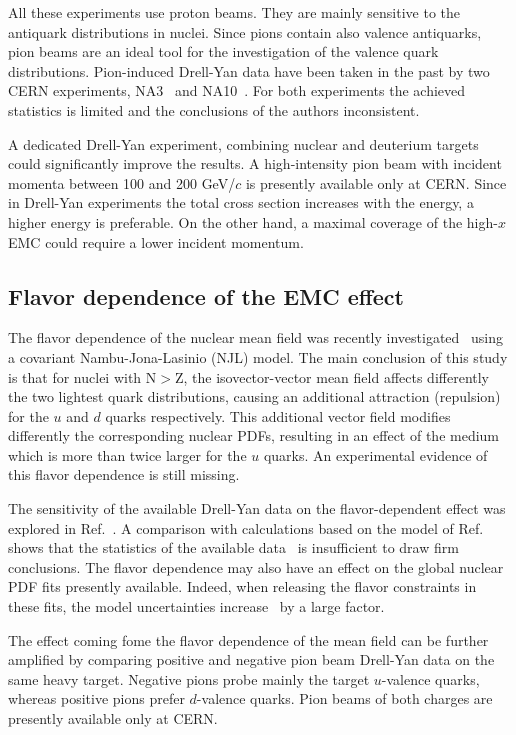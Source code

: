 All these experiments use proton beams. They are mainly sensitive to the antiquark 
distributions in nuclei.  Since pions contain also valence antiquarks, pion beams are  
an ideal tool for the investigation of the valence quark distributions. Pion-induced Drell-Yan data have 
been taken in the past by two CERN experiments, NA3~\cite{Badier:1981ci} 
and NA10~\cite{Bordalo:1987cs}.  For both experiments the achieved statistics is limited
and the conclusions of the authors inconsistent.  

A dedicated Drell-Yan experiment, 
combining nuclear and deuterium targets could significantly improve the results. 
A high-intensity pion beam with incident momenta between 100 and 200 GeV/$c$ is presently available 
only at CERN. Since in Drell-Yan experiments the total cross section increases with the energy, a higher 
energy is preferable. On the other hand, a maximal coverage of the high-$x$ EMC could require a 
lower incident momentum.  

\subsection{Flavor dependence of the EMC effect} 
The flavor dependence of the nuclear mean field was recently investigated~\cite{Cloet:2009qs} using a 
covariant Nambu-Jona-Lasinio (NJL) model.  The main conclusion of this study is that for nuclei with 
N$>$Z, the isovector-vector mean field affects differently the two lightest quark distributions,
causing an additional attraction (repulsion) for the $u$ and $d$ quarks respectively. 
This additional vector field modifies differently the corresponding nuclear PDFs, resulting in an effect of 
the medium which is more than twice larger for the $u$ quarks. An experimental evidence of this flavor 
dependence is still missing. 

The sensitivity of the available Drell-Yan data on the flavor-dependent effect was explored in 
Ref.~\cite{Dutta:2010pg}. A comparison with calculations based on the model of Ref.~\cite{Cloet:2009qs} 
shows that the  statistics of the available data~\cite{Badier:1981ci,Bordalo:1987cs} is insufficient to draw firm conclusions. 
The flavor dependence may also have an effect 
on the global nuclear PDF fits presently available. Indeed, when releasing the flavor constraints in these fits, 
the model uncertainties increase~\cite{Paakinen:2017} by a large factor. 

The effect coming fome the flavor dependence of the mean field can be further amplified by 
comparing positive and negative pion beam Drell-Yan data on the same heavy target. Negative pions probe mainly the 
target $u$-valence quarks, whereas positive pions prefer $d$-valence quarks. Pion beams of both charges
are presently available only at CERN. 

